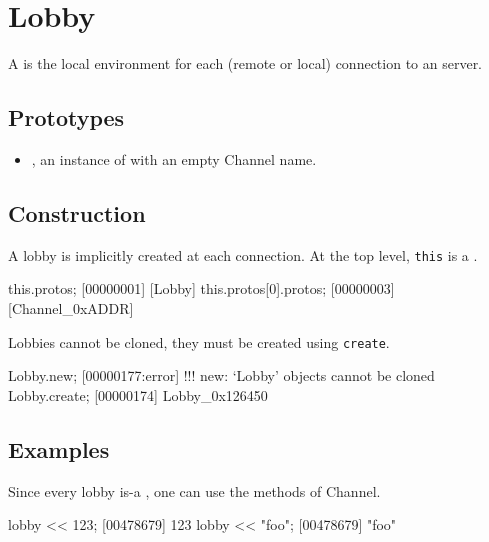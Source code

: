 \section{Lobby}

A  is the local environment for each (remote or local)
connection to an \urbi server.

\subsection{Prototypes}
\begin{itemize}
\item {}, an instance of 
  with an empty Channel name.
\end{itemize}

\subsection{Construction}

A lobby is implicitly created at each connection. At the top level,
\lstinline|this| is a .

\begin{urbiscript}
this.protos;
[00000001] [Lobby]
this.protos[0].protos;
[00000003] [Channel_0xADDR]
\end{urbiscript}

Lobbies cannot be cloned, they must be created using
\lstinline|create|.

\begin{urbiscript}
Lobby.new;
[00000177:error] !!! new: `Lobby' objects cannot be cloned
Lobby.create;
[00000174] Lobby_0x126450
\end{urbiscript}


\subsection{Examples}

Since every lobby is-a , one can use the methods of
Channel.

\begin{urbiscript}
lobby << 123;
[00478679] 123
lobby << "foo";
[00478679] "foo"
\end{urbiscript}

